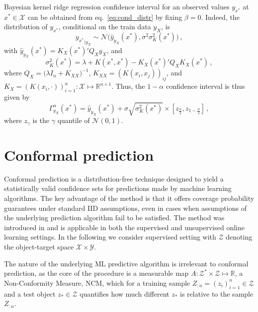 \documentclass[a4paper,14pt]{extarticle}
\newcommand{\Ncal}{\mathcal{N}}
\newcommand{\Xcal}{\mathcal{X}}
\newcommand{\Ycal}{\mathcal{Y}}
\newcommand{\Zcal}{\mathcal{Z}}
\newcommand{\Real}{\mathbb{R}}
\begin{document}
Bayesian kernel ridge regression confidence interval for an observed values $y_{x^*}$
at $x^*\in \Xcal$ can be obtained from eq.~\ref{eq:cond_distr} by fixing $\beta = 0$.
Indeed, the distribution of $y_{x^*}$, conditional on the train data $y_X$, is
\begin{equation} \label{eq:gp_cond_dist}
{y_{x^*}}_{|y_X}
  \sim \Ncal\bigl( \hat{y}_{y_X}(x^*), \sigma^2 \sigma_K^2(x^*) \bigr) \,,
\end{equation}
with $\hat{y}_{y_X}(x^*) = K_X(x^*)' Q_X y_X$, and
\begin{equation*}
  \sigma_K^2(x^*)
    = \lambda + K(x^*, x^*) - K_X(x^*)' Q_X K_X(x^*) \,,
\end{equation*}
where $Q_X = \bigl(\lambda I_n + K_{XX}\bigr)^{-1}$, $K_{XX} = (K(x_i,x_j))_{ij}$,
and $K_X = (K(x_i, \cdot))_{i=1}^n: \Xcal \mapsto \Real^{n\times1}$. Thus, the $1 - \alpha$
confidence interval is thus given by
\begin{equation} \label{eq:gp_conf_int}
\Gamma^\alpha_{y_X}(x^*)
  = \hat{y}_{y_X}(x^*)
  + \sigma \sqrt{\sigma_K^2(x^*)}
  \times [z_{\frac{\alpha}{2}}, z_{1-\frac{\alpha}{2}}]
  \,,
\end{equation}
where $z_\gamma$ is the $\gamma$ quantile of $\Ncal(0, 1)$.



\section{Conformal prediction} %
\label{sec:conformal_prediction}

Conformal prediction is a distribution-free technique designed to yield a statistically
valid confidence sets for predictions made by machine learning algorithms. The key
advantage of the method is that it offers coverage probability guarantees under standard
IID assumptions, even in cases when assumptions of the underlying prediction algorithm
fail to be satisfied. The method was introduced in \cite{vovk2005} and is applicable
in both the supervised and unsupervised online learning settings. In the following
we consider supervised setting with $\Zcal$ denoting the object-target space $\Xcal \times \Ycal$.

The nature of the underlying ML predictive algorithm is irrelevant to conformal
prediction, as the core of the procedure is a measurable map $A: \Zcal^*\times \Zcal \mapsto \Real$,
a Non-Conformity Measure, NCM, which for a training sample $Z_{:n}=(z_i)_{i=1}^n\in\Zcal$
and a test object $z_* \in \Zcal$ quantifies how much different $z_*$ is relative
to the sample $Z_{:n}$.
\end{document}
